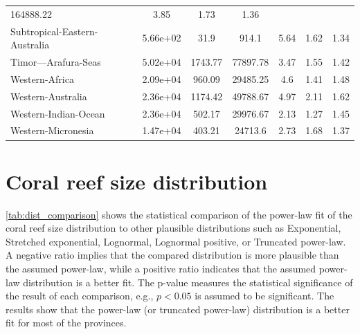 \begin{table}[H]
{\begin{tabular}{lcccccc}
            164888.22                                  &
            3.85                                       & 1.73     & 1.36
            \\
            Subtropical-Eastern-Australia              & 5.66e+02 & 31.9    &
            914.1                                      &
            5.64                                       & 1.62     & 1.34
            \\
            Timor---Arafura-Seas                       & 5.02e+04 & 1743.77 &
            77897.78                                   &
            3.47                                       & 1.55     & 1.42
            \\
            Western-Africa                             & 2.09e+04 & 960.09  &
            29485.25                                   &
            4.6                                        & 1.41     & 1.48
            \\
            Western-Australia                          & 2.36e+04 & 1174.42 &
            49788.67                                   &
            4.97                                       & 2.11     & 1.62
            \\
            Western-Indian-Ocean                       & 2.36e+04 & 502.17  &
            29976.67                                   &
            2.13                                       & 1.27     & 1.45
            \\
            Western-Micronesia                         & 1.47e+04 & 403.21  &
            24713.6                                    &
            2.73                                       & 1.68     & 1.37
            \\
            \hline
        \end{tabular}%
    }
\end{table}

\section{Coral reef size distribution}

\cref{tab:dist_comparison} shows the statistical comparison of the power-law
fit of the coral reef size distribution to other plausible distributions such
as Exponential, Stretched exponential, Lognormal, Lognormal positive, or
Truncated power-law. A negative ratio implies that the compared distribution is
more plausible than the assumed power-law, while a positive ratio indicates
that the assumed power-law distribution is a better fit. The p-value measures
the statistical significance of the result of each comparison, e.g., $p<0.05$
is assumed to be significant. The results show that the power-law (or truncated
power-law) distribution is a better fit for most of the provinces.

